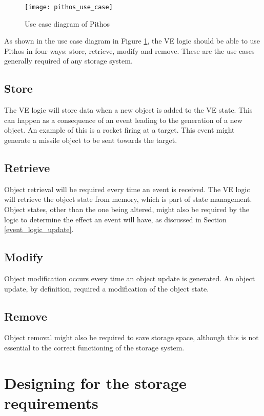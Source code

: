 \begin{figure}[htbp]
 \centering
 \texttt{[image: pithos\_use\_case]}
 \caption{Use case diagram of Pithos}
 \label{fig_pithos_use_case}
\end{figure}

As shown in the use case diagram in Figure \ref{fig_pithos_use_case}, the VE logic should be able to use Pithos in four ways: store, retrieve, modify and remove. These are the use cases generally required of any storage system.

\subsection{Store}

The VE logic will store data when a new object is added to the VE state. This can happen as a consequence of an event leading to the generation of a new object. An example of this is a rocket firing at a target. This event might generate a missile object to be sent towards the target.

\subsection{Retrieve}
Object retrieval will be required every time an event is received. The VE logic will retrieve the object state from memory, which is part of state management. Object states, other than the one being altered, might also be required by the logic to determine the effect an event will have, as discussed in Section \ref{event_logic_update}.

\subsection{Modify}
Object modification occurs every time an object update is generated. An object update, by definition, required a modification of the object state.

\subsection{Remove}
Object removal might also be required to save storage space, although this is not essential to the correct functioning of the storage system.

\section{Designing for the storage requirements}

